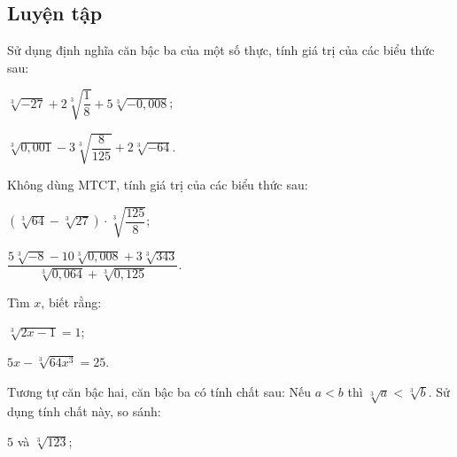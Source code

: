 \begin{practice}
    \subsection{Luyện tập}

    \begin{questions}[resume=SBT]
        \item Sử dụng định nghĩa căn bậc ba của một số thực, tính giá trị của các biểu thức sau:
        \begin{questions}
            \item $\sqrt[3]{-27}+2\sqrt[3]{\dfrac{1}{8}}+5\sqrt[3]{-0,008}$;

            \answerline
            \answerline

            \item $\sqrt[3]{0,001}-3\sqrt[3]{\dfrac{8}{125}}+2\sqrt[3]{-64}$.

            \answerline
            \answerline
        \end{questions}

        \item Không dùng MTCT, tính giá trị của các biểu thức sau:
        \begin{questions}
            \item $\left(\sqrt[3]{64}-\sqrt[3]{27}\right)\cdot\sqrt[3]{\dfrac{125}{8}}$;

            \answerline
            \answerline

            \item $\dfrac{5\sqrt[3]{-8}-10\sqrt[3]{0,008}+3\sqrt[3]{343}}{\sqrt[3]{0,064}+\sqrt[3]{0,125}}$.

            \answerline
            \answerline
            \answerline
        \end{questions}

        \item Tìm $x$, biết rằng:
        \begin{questions}
            \item $\sqrt[3]{2x-1}=1$;

            \answerline
            \answerline

            \item $5x-\sqrt[3]{64x^3}=25$.

            \answerline
            \answerline
        \end{questions}

        \item Tương tự căn bậc hai, căn bậc ba có tính chất sau: Nếu $a<b$ thì $\sqrt[3]{a}<\sqrt[3]{b}$. Sử dụng tính chất này, so sánh:
        \begin{questions}
            \item $5$ và $\sqrt[3]{123}$;


\end{questions}
\end{questions}
\end{practice}

